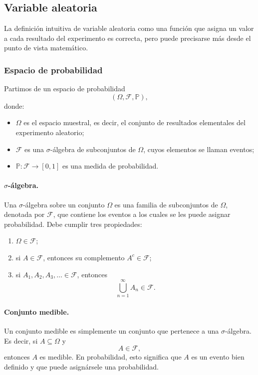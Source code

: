 \documentclass{article}
\begin{document}
\subsection{Variable aleatoria}

La definición intuitiva de variable aleatoria como una función que asigna un valor a cada resultado del experimento es correcta, pero puede precisarse más desde el punto de vista matemático.

\subsubsection*{Espacio de probabilidad}

Partimos de un espacio de probabilidad
\[
(\Omega,\mathcal{F},\mathbb{P}),
\]
donde:

\begin{itemize}
\item \(\Omega\) es el espacio muestral, es decir, el conjunto de resultados elementales del experimento aleatorio;
\item \(\mathcal{F}\) es una \(\sigma\)-álgebra de subconjuntos de \(\Omega\), cuyos elementos se llaman eventos;
\item \(\mathbb{P}:\mathcal{F}\to [0,1]\) es una medida de probabilidad.
\end{itemize}

\paragraph{\(\sigma\)-álgebra.}
Una \(\sigma\)-álgebra sobre un conjunto \(\Omega\) es una familia de subconjuntos de \(\Omega\), denotada por \(\mathcal{F}\), que contiene los eventos a los cuales se les puede asignar probabilidad. Debe cumplir tres propiedades:

\begin{enumerate}
\item \(\Omega \in \mathcal{F}\);
\item si \(A \in \mathcal{F}\), entonces su complemento \(A^c \in \mathcal{F}\);
\item si \(A_1,A_2,A_3,\dots \in \mathcal{F}\), entonces
\[
\bigcup_{n=1}^{\infty} A_n \in \mathcal{F}.
\]
\end{enumerate}

\paragraph{Conjunto medible.}
Un conjunto medible es simplemente un conjunto que pertenece a una \(\sigma\)-álgebra. Es decir, si \(A \subseteq \Omega\) y
\[
A \in \mathcal{F},
\]
entonces \(A\) es medible. En probabilidad, esto significa que \(A\) es un evento bien definido y que puede asignársele una probabilidad.
\end{document}
